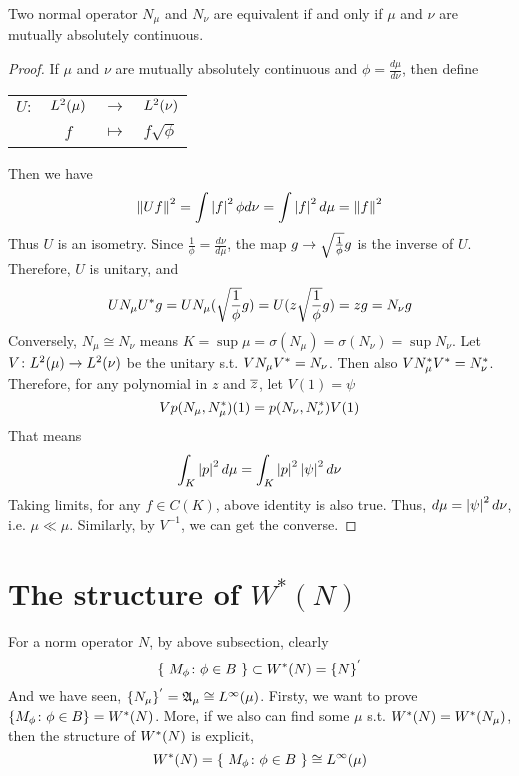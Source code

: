 \documentclass[a4paper,11pt]{report}
\begin{document}
\begin{thm}
	Two normal operator $N_{\mu}$ and $N_{\nu}$ are equivalent if and only if $\mu$ and $\nu$ are mutually absolutely continuous.
\end{thm}
\begin{proof}
	If $\mu$ and $\nu$ are mutually absolutely continuous and $\phi = \frac{d\mu}{d\nu}$, then define
	\begin{center}
		\begin{tabular}{l c c l}
			$U \colon$ & $L^{2}(\mu)$ & $\longrightarrow$ & $L^{2}(\nu)$ \\
			~ & $f$ & $\longmapsto$ & $f\sqrt{\phi}$
		\end{tabular}
	\end{center}
	Then we have
	\begin{equation*}
		\left\lVert Uf\right\lVert^2 = \int \left\lvert f\right\lvert^2 \phi d\nu = \int \left\lvert f\right\lvert^2 d \mu = \left\lVert f\right\lVert^2
	\end{equation*}
	Thus $U$ is an isometry. Since $\frac{1}{\phi} = \frac{d\nu}{d \mu}$, the map $g \rightarrow \sqrt{\frac{1}{\phi}}g$ is the inverse of $U$. Therefore, $U$ is unitary, and
	\begin{equation*}
		UN_{\mu}U^{*}g = UN_{\mu}(\sqrt{\frac{1}{\phi}}g) = U(z\sqrt{\frac{1}{\phi}}g) = zg = N_{\nu}g
	\end{equation*}
	Conversely, $N_{\mu} \cong N_{\nu}$ means $K=\sup{\mu} = \sigma(N_{\mu}) = \sigma(N_{\nu}) = \sup{N_{\nu}}$. Let $V \colon L^{2}(\mu) \rightarrow L^{2}(\nu)$ be the unitary s.t. $VN_{\mu}V^{*}=N_{\nu}$. Then also $VN_{\mu}^{*}V^{*}=N_{\nu}^{*}$. Therefore, for any polynomial in $z$ and $\overline{z}$, let $V(1) = \psi$
	\begin{equation*}
		Vp(N_{\mu},N_{\mu}^{*})(1) = p(N_{\nu},N_{\nu}^{*})V(1)
	\end{equation*}
	That means
	\begin{equation*}
		\int_{K} \left\lvert p\right\lvert^2 d\mu = \int_{K} \left\lvert p\right\lvert^2 \left\lvert\psi\right\lvert^2 d \nu
	\end{equation*}
	Taking limits, for any $f \in C(K)$, above identity is also true. Thus, $d \mu = \left\lvert\psi\right\lvert^2 d \nu$, i.e. $\mu \ll \mu$. Similarly, by $V^{-1}$, we can get the converse.
\end{proof}

\section{The structure of \texorpdfstring{$W^{*}(N)$}{W*(N)}}

For a norm operator $N$, by above subsection, clearly
\begin{equation*}
	\{~M_{\phi} \colon \phi \in B~\} \subset W^{*}(N) = \{N\}^{'}
\end{equation*}
And we have seen, $\{N_{\mu}\}^{'} = \mathfrak{A}_{\mu} \cong L^{\infty}(\mu)$. Firsty, we want to prove $\{M_{\phi} \colon \phi \in B\} = W^{*}(N)$. More, if we also can find some $\mu$ s.t. $W^{*}(N)=W^{*}(N_{\mu})$, then the structure of $W^{*}(N)$ is explicit, 
\begin{equation*}
	W^{*}(N) = \{~M_{\phi} \colon \phi \in B~\} \cong L^{\infty}(\mu)
\end{equation*}
\end{document}
